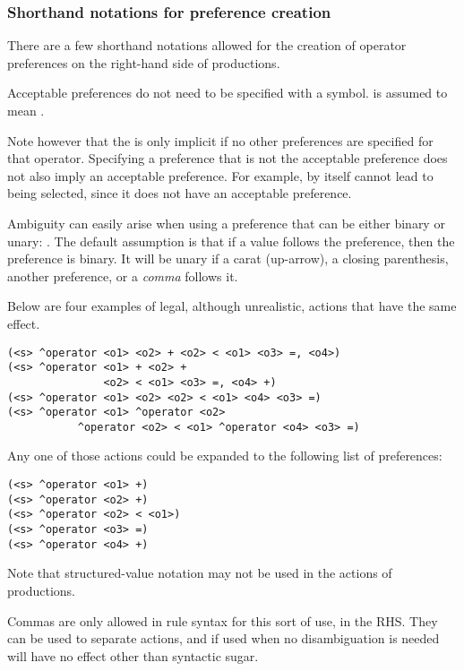 \subsubsection{Shorthand notations for preference creation}

There are a few shorthand notations allowed for the creation of operator preferences on the right-hand side of productions.

Acceptable preferences do not need to be specified with a \soar{+} symbol.  is assumed to mean .

Note however that the \soar{+} is only implicit if no other preferences are specified for that operator. Specifying a preference that is not the acceptable preference does not also imply an acceptable preference. For example,  by itself cannot lead to  being selected, since it does not have an acceptable preference. 

Ambiguity can easily arise when using a preference that can be either binary or unary: \soar{> < =}. The default assumption is that if a value follows the preference, then the preference is binary. It will be unary if a carat (up-arrow), a closing parenthesis, another preference, or a \emph{comma} follows it. 

Below are four examples of legal, although unrealistic, actions that have the
same effect.

\begin{verbatim}
(<s> ^operator <o1> <o2> + <o2> < <o1> <o3> =, <o4>)
(<s> ^operator <o1> + <o2> + 
               <o2> < <o1> <o3> =, <o4> +)
(<s> ^operator <o1> <o2> <o2> < <o1> <o4> <o3> =)
(<s> ^operator <o1> ^operator <o2>
           ^operator <o2> < <o1> ^operator <o4> <o3> =)
\end{verbatim}

Any one of those actions could be expanded to the following list of
preferences: 

\begin{verbatim}
(<s> ^operator <o1> +)
(<s> ^operator <o2> +)
(<s> ^operator <o2> < <o1>)
(<s> ^operator <o3> =)
(<s> ^operator <o4> +)
\end{verbatim}

Note that structured-value notation may not be used in the actions of 
productions.

Commas are only allowed in rule syntax for this sort of use, in the RHS. They can be used to separate actions, and if used when no disambiguation is needed will have no effect other than syntactic sugar.

